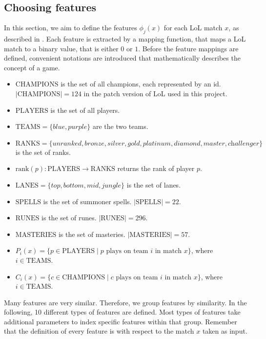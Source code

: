 \subsection{Choosing features}\label{sec:choosingfeatures}
In this section, we aim to define the features $\phi_j(x)$ for each LoL match $x$, as described in .
Each feature is extracted by a mapping function, that maps a LoL match to a binary value, that is either $0$ or $1$.
Before the feature mappings are defined, convenient notations are introduced that mathematically describes the concept of a game.
\begin{itemize}

\item $\text{CHAMPIONS}$ is the set of all champions, each represented by an id. $|\text{CHAMPIONS}| = 124$ in the patch version of LoL used in this project.
\item $\text{PLAYERS}$ is the set of all players.
\item $\text{TEAMS} = \{\textit{blue}, \textit{purple}\}$ are the two teams.
\item $\text{RANKS} = \{\textit{unranked},\textit{bronze},\textit{silver},\textit{gold},\textit{platinum},\textit{diamond},\textit{master},\textit{challenger}\}$ is the set of ranks.
\item $\text{rank}(p) : \text{PLAYERS} \rightarrow \text{RANKS}$ returns the rank of player $p$.
\item $\text{LANES} = \{\textit{top},\textit{bottom},\textit{mid},\textit{jungle}\}$ is the set of lanes.
\item $\text{SPELLS}$ is the set of summoner spells. $|\text{SPELLS}| = 22$.
\item $\text{RUNES}$ is the set of runes. $|\text{RUNES}| = 296$.
\item $\text{MASTERIES}$ is the set of masteries. $|\text{MASTERIES}| = 57$.
\item $P_i(x) = \{ p \in \text{PLAYERS} \mid p \text{ plays on team } i \text{ in match } x \}$, where $i \in \text{TEAMS}$.
\item $C_i(x) = \{ c \in \text{CHAMPIONS} \mid c \text{ plays on team } i \text{ in match } x \}$, where $i \in \text{TEAMS}$.

\end{itemize}

Many features are very similar. Therefore, we group features by similarity.
In the following, 10 different types of features are defined. Most types of features take additional parameters to index specific features within that group.
Remember that the definition of every feature is with respect to the match $x$ taken as input.

